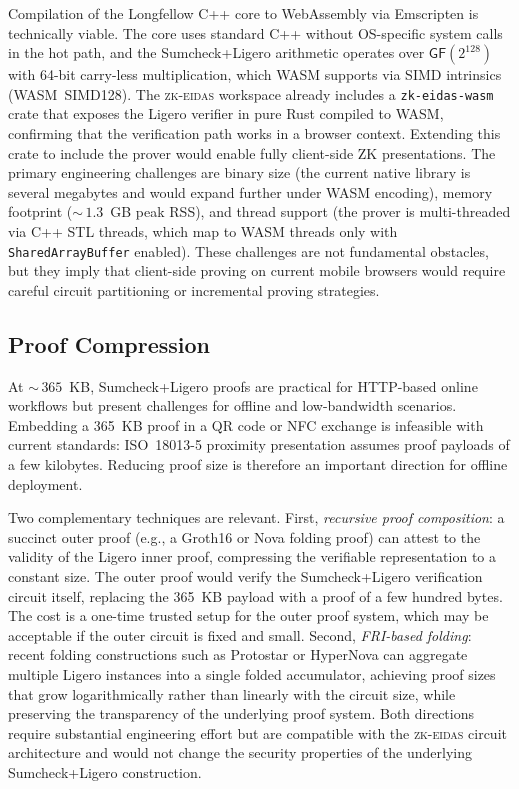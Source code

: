 Compilation of the Longfellow C++ core to WebAssembly via Emscripten is technically
viable.
The core uses standard C++ without OS-specific system calls in the hot path, and the
Sumcheck+Ligero arithmetic operates over $\mathsf{GF}(2^{128})$ with 64-bit carry-less
multiplication, which WASM supports via SIMD intrinsics (WASM~SIMD128).
The \textsc{zk-eidas} workspace already includes a \texttt{zk-eidas-wasm} crate that
exposes the Ligero verifier in pure Rust compiled to WASM, confirming that the
verification path works in a browser context.
Extending this crate to include the prover would enable fully client-side ZK
presentations.
The primary engineering challenges are binary size (the current native library is
several megabytes and would expand further under WASM encoding), memory footprint
(${\sim}\,1.3$~GB peak RSS), and thread support (the prover is multi-threaded via C++
STL threads, which map to WASM threads only with \texttt{SharedArrayBuffer} enabled).
These challenges are not fundamental obstacles, but they imply that client-side proving
on current mobile browsers would require careful circuit partitioning or incremental
proving strategies.

\subsection{Proof Compression}\label{sec:disc-compression}

At ${\sim}\,365$~KB, Sumcheck+Ligero proofs are practical for HTTP-based online
workflows but present challenges for offline and low-bandwidth scenarios.
Embedding a 365~KB proof in a QR code or NFC exchange is infeasible with current
standards: ISO~18013-5 proximity presentation assumes proof payloads of a few kilobytes.
Reducing proof size is therefore an important direction for offline deployment.

Two complementary techniques are relevant.
First, \emph{recursive proof composition}: a succinct outer proof (e.g., a Groth16 or
Nova folding proof) can attest to the validity of the Ligero inner proof, compressing
the verifiable representation to a constant size.
The outer proof would verify the Sumcheck+Ligero verification circuit itself, replacing
the 365~KB payload with a proof of a few hundred bytes.
The cost is a one-time trusted setup for the outer proof system, which may be acceptable
if the outer circuit is fixed and small.
Second, \emph{FRI-based folding}: recent folding constructions such as Protostar or
HyperNova can aggregate multiple Ligero instances into a single folded accumulator,
achieving proof sizes that grow logarithmically rather than linearly with the circuit
size, while preserving the transparency of the underlying proof system.
Both directions require substantial engineering effort but are compatible with the
\textsc{zk-eidas} circuit architecture and would not change the security properties of
the underlying Sumcheck+Ligero construction.

